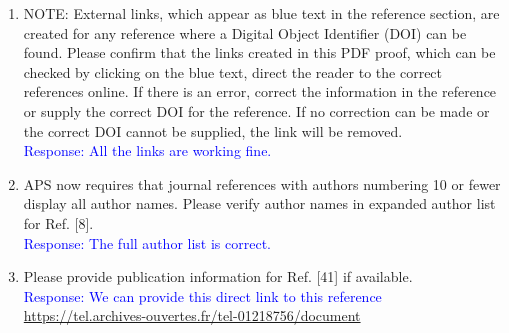 \documentclass[a4paper,11pt,twoside]{article}
\begin{document}
\begin{enumerate}
\item NOTE: External links, which appear as blue text in the reference section, 
   are created for any reference where a Digital Object Identifier (DOI) can be 
      found. Please confirm that the links created in this PDF proof, which can 
      be checked by clicking on the blue text, direct the reader to the correct 
      references online. If there is an error, correct the information in the 
      reference or supply the correct DOI for the reference. If no correction 
      can be made or the correct DOI cannot be supplied, the link will be 
      removed.\\
      \textcolor{blue}{Response: All the links are working fine. }

   \item  APS now requires that journal references with authors numbering 10 or 
      fewer display all author names. Please verify author names in expanded 
      author list for Ref. [8].\\
      \textcolor{blue}{Response: The full author list is correct.}

\item Please provide publication information for Ref. [41] if available.\\
      \textcolor{blue}{Response: We can provide this direct link to this 
      reference \url{https://tel.archives-ouvertes.fr/tel-01218756/document}}

\end{enumerate}
\end{document}
